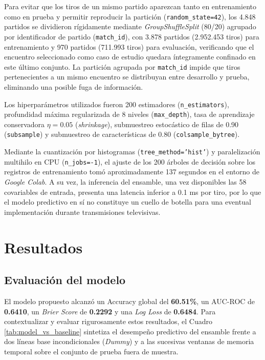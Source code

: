 \documentclass[journal]{IEEEtran}
\begin{document}
Para evitar que los tiros de un mismo partido aparezcan tanto en entrenamiento como en prueba y permitir reproducir la partición (\texttt{random\_state=42}), los 4.848 partidos se dividieron rígidamente mediante \textit{GroupShuffleSplit} (80/20) agrupado por identificador de partido (\texttt{match\_id}), con 3.878 partidos (2.952.453 tiros) para entrenamiento y 970 partidos (711.993 tiros) para evaluación, verificando que el encuentro seleccionado como caso de estudio quedara íntegramente confinado en este último conjunto. La partición agrupada por \texttt{match\_id} impide que tiros pertenecientes a un mismo encuentro se distribuyan entre desarrollo y prueba, eliminando una posible fuga de información.

Los hiperparámetros utilizados fueron 200 estimadores (\texttt{n\_estimators}), profundidad máxima regularizada de 8 niveles (\texttt{max\_depth}), tasa de aprendizaje conservadora $\eta = 0.05$ (\textit{shrinkage}), submuestreo estocástico de filas de 0.90 (\texttt{subsample}) y submuestreo de características de 0.80 (\texttt{colsample\_bytree}). 

Mediante la cuantización por histogramas (\texttt{tree\_method='hist'}) y paralelización multihilo en CPU (\texttt{n\_jobs=-1}), el ajuste de los 200 árboles de decisión sobre los registros de entrenamiento tomó aproximadamente 137 segundos en el entorno de \textit{Google Colab}. A su vez, la inferencia del ensamble, una vez disponibles las 58 covariables de entrada, presenta una latencia inferior a 0.1 ms por tiro, por lo que el modelo predictivo en sí no constituye un cuello de botella para una eventual implementación durante transmisiones televisivas.

\section{Resultados}
\subsection{Evaluación del modelo}
El modelo propuesto alcanzó un Accuracy global del \textbf{60.51\%}, un AUC-ROC de \textbf{0.6410}, un \textit{Brier Score} de \textbf{0.2292} y una \textit{Log Loss} de \textbf{0.6484}. Para contextualizar y evaluar rigurosamente estos resultados, el Cuadro \ref{tab:model_vs_baseline} sintetiza el desempeño predictivo del ensamble frente a dos líneas base incondicionales (\textit{Dummy}) y a las sucesivas ventanas de memoria temporal sobre el conjunto de prueba fuera de muestra.
\end{document}
